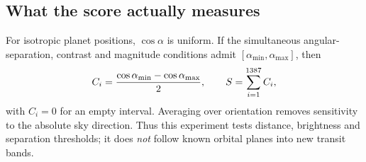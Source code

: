 \subsection*{What the score actually measures}
For isotropic planet positions, $\cos\alpha$ is uniform. If the simultaneous angular-separation, contrast and magnitude conditions admit $[\alpha_{\min},\alpha_{\max}]$, then
\begin{equation}
 C_i=\frac{\cos\alpha_{\min}-\cos\alpha_{\max}}{2},\qquad
 S=\sum_{i=1}^{1387} C_i,
\end{equation}
with $C_i=0$ for an empty interval. Averaging over orientation removes sensitivity to the absolute sky direction. Thus this experiment tests distance, brightness and separation thresholds; it does \emph{not} follow known orbital planes into new transit bands.

